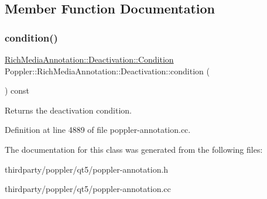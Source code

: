 \subsection{Member Function Documentation}
\mbox{\label{class_poppler_1_1_rich_media_annotation_1_1_deactivation_afd8f14b9dc45f7392b9a41ed4e2f768b}} 
\subsubsection{\texorpdfstring{condition()}{condition()}}
{\footnotesize\ttfamily \hyperlink{class_poppler_1_1_rich_media_annotation_1_1_deactivation_a54ffabfb7c1f3ad2ea052ba6689468d3}{Rich\+Media\+Annotation\+::\+Deactivation\+::\+Condition} Poppler\+::\+Rich\+Media\+Annotation\+::\+Deactivation\+::condition (\begin{DoxyParamCaption}{ }\end{DoxyParamCaption}) const}

Returns the deactivation condition. 

Definition at line 4889 of file poppler-\/annotation.\+cc.



The documentation for this class was generated from the following files\+:\begin{DoxyCompactItemize}
\item 
thirdparty/poppler/qt5/poppler-\/annotation.\+h\item 
thirdparty/poppler/qt5/poppler-\/annotation.\+cc\end{DoxyCompactItemize}
